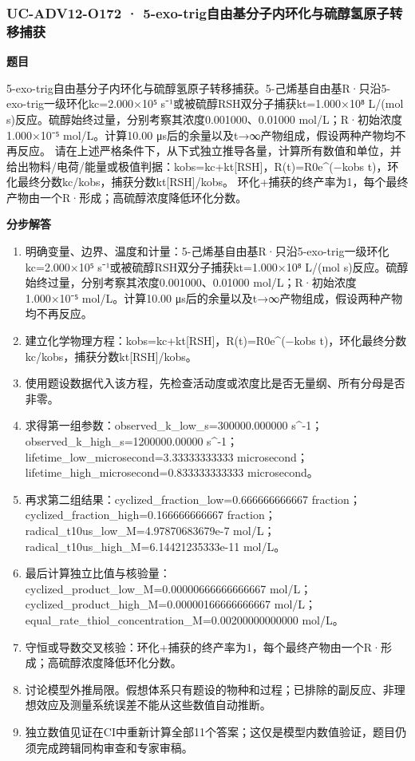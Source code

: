 \documentclass[UTF8,11pt,a4paper]{ctexart}
\begin{document}
\subsubsection*{UC-ADV12-O172 · 5-exo-trig自由基分子内环化与硫醇氢原子转移捕获}
\noindent\textbf{题目}\par
5-exo-trig自由基分子内环化与硫醇氢原子转移捕获。5-己烯基自由基R·只沿5-exo-trig一级环化kc=2.000×10⁵ s⁻¹或被硫醇RSH双分子捕获kt=1.000×10⁸ L/(mol s)反应。硫醇始终过量，分别考察其浓度0.001000、0.01000 mol/L；R·初始浓度1.000×10⁻⁵ mol/L。计算10.00 μs后的余量以及t→∞产物组成，假设两种产物均不再反应。 请在上述严格条件下，从下式独立推导各量，计算所有数值和单位，并给出物料/电荷/能量或极值判据：kobs=kc+kt[RSH]，R(t)=R0e\textasciicircum{}(−kobs t)，环化最终分数kc/kobs，捕获分数kt[RSH]/kobs。 环化+捕获的终产率为1，每个最终产物由一个R·形成；高硫醇浓度降低环化分数。\par
\medskip\noindent\textbf{分步解答}
\begin{enumerate}
\item 明确变量、边界、温度和计量：5-己烯基自由基R·只沿5-exo-trig一级环化kc=2.000×10⁵ s⁻¹或被硫醇RSH双分子捕获kt=1.000×10⁸ L/(mol s)反应。硫醇始终过量，分别考察其浓度0.001000、0.01000 mol/L；R·初始浓度1.000×10⁻⁵ mol/L。计算10.00 μs后的余量以及t→∞产物组成，假设两种产物均不再反应。
\item 建立化学物理方程：kobs=kc+kt[RSH]，R(t)=R0e\textasciicircum{}(−kobs t)，环化最终分数kc/kobs，捕获分数kt[RSH]/kobs。
\item 使用题设数据代入该方程，先检查活动度或浓度比是否无量纲、所有分母是否非零。
\item 求得第一组参数：observed\_k\_low\_s=300000.000000 s\textasciicircum{}-1；observed\_k\_high\_s=1200000.00000 s\textasciicircum{}-1；lifetime\_low\_microsecond=3.33333333333 microsecond；lifetime\_high\_microsecond=0.833333333333 microsecond。
\item 再求第二组结果：cyclized\_fraction\_low=0.666666666667 fraction；cyclized\_fraction\_high=0.166666666667 fraction；radical\_t10us\_low\_M=4.97870683679e-7 mol/L；radical\_t10us\_high\_M=6.14421235333e-11 mol/L。
\item 最后计算独立比值与核验量：cyclized\_product\_low\_M=0.00000666666666667 mol/L；cyclized\_product\_high\_M=0.00000166666666667 mol/L；equal\_rate\_thiol\_concentration\_M=0.00200000000000 mol/L。
\item 守恒或导数交叉核验：环化+捕获的终产率为1，每个最终产物由一个R·形成；高硫醇浓度降低环化分数。
\item 讨论模型外推局限。假想体系只有题设的物种和过程；已排除的副反应、非理想效应及测量系统误差不能从这些数值自动推断。
\item 独立数值见证在CI中重新计算全部11个答案；这仅是模型内数值验证，题目仍须完成跨辑同构审查和专家审稿。
\end{enumerate}
\end{document}
